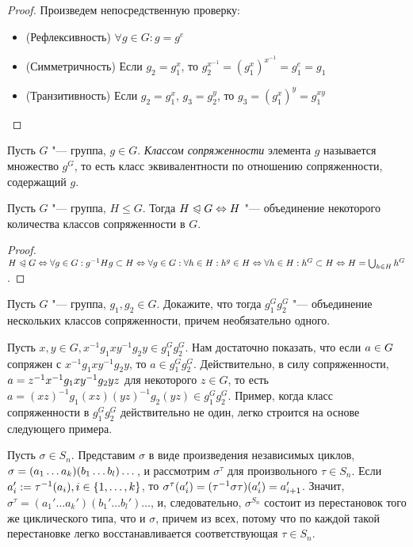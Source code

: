 \begin{proof} Произведем непосредственную проверку:
	\begin{itemize}
		\item (Рефлексивность) $\forall g \in G: g = g^e$
		\item (Симметричность) Если $g_2 = g_1^x$, то $g_2^{x^{-1}} = (g_1^x)^{x^{-1}} = g_1^e = g_1$
		\item (Транзитивность) Если $g_2 = g_1^x$, $g_3 = g_2^y$, то $g_3 = (g_1^x)^y = g_1^{xy}$
	\end{itemize}
\end{proof}

\begin{definition}
	Пусть $G$ "--- группа, $g \in G$. \textit{Классом сопряженности} элемента $g$ называется множество $g^G$, то есть класс эквивалентности по отношению сопряженности, содержащий $g$.
\end{definition}

\begin{proposition}
	Пусть $G$ "--- группа, $H \le G$. Тогда $H \normal G \hm\Leftrightarrow H$ "--- объединение некоторого количества классов сопряженности в $G$.
\end{proposition}

\begin{proof}
	$H \normal G \Leftrightarrow \forall g \in G: g^{-1}Hg \subset H \Leftrightarrow \forall g \in G: \forall h \hm\in H: h^g \in H \Leftrightarrow \forall h \in H: h^G \subset H \Leftrightarrow H = \bigcup_{h \in H}h^G$.
\end{proof}

\begin{exercise}
	Пусть $G$ "--- группа, $g_1, g_2 \in G$. Докажите, что тогда $g_1^Gg_2^G$ "--- объединение нескольких классов сопряженности, причем необязательно одного.
\end{exercise}

\begin{solution}
	Пусть $x, y \in G, x^{-1}g_1xy^{-1}g_2y \in g_1^Gg_2^G$. Нам достаточно показать, что если $a \hm\in G$ сопряжен с $x^{-1}g_1xy^{-1}g_2y$, то $a \in g_1^Gg_2^G$. Действительно, в силу сопряженности, $a \hm= z^{-1}x^{-1}g_1xy^{-1}g_2yz$ для некоторого $z \in G$, то есть $a = (xz)^{-1}g_1(xz)(yz)^{-1}g_2(yz) \in g_1^Gg_2^G$. Пример, когда класс сопряженности в $g_1^Gg_2^G$ действительно не один, легко строится на основе следующего примера.
\end{solution}

\begin{example}
	Пусть $\sigma \in S_n$. Представим $\sigma$ в виде произведения независимых циклов, $\sigma \hm= (a_1\dotsc a_k)(b_1\dotsc b_l)\dotsc$, и рассмотрим $\sigma^\tau$ для произвольного $\tau \in S_n$. Если $a_i' := \tau^{-1}(a_i), i \hm\in \{1, \dots, k\}$, то $\sigma^\tau(a_i') \hm= (\tau^{-1}\sigma\tau)(a_i') = a_{i + 1}'$. Значит, $\sigma^\tau = (a_1'\dotsc a_k')(b_1'\dotsc b_l')\dotsc$, и, следовательно, $\sigma^{S_n}$ состоит из перестановок того же циклического типа, что и $\sigma$, причем из всех, потому что по каждой такой перестановке легко восстанавливается соответствующая $\tau \in S_n$.
\end{example}